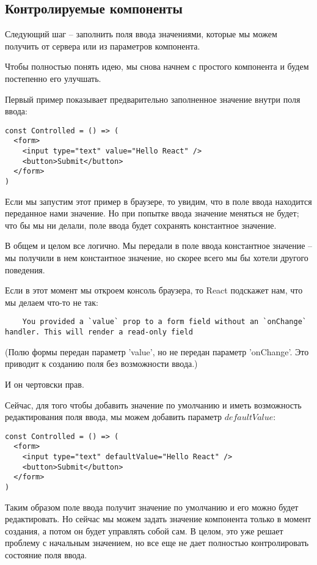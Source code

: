 \subsection{Контролируемые компоненты}

Следующий шаг -- заполнить поля ввода значениями, которые мы можем получить от сервера или из параметров компонента.

Чтобы полностью понять идею, мы снова начнем с простого компонента и будем постепенно его улучшать.

Первый пример показывает предварительно заполненное значение внутри поля ввода:

\begin{lstlisting}
const Controlled = () => (
  <form>
    <input type="text" value="Hello React" />
    <button>Submit</button>
  </form>
)
\end{lstlisting}

Если мы запустим этот пример в браузере, то увидим, что в поле ввода находится переданное нами значение. Но при попытке ввода значение меняться не будет; что бы мы ни делали, поле ввода будет сохранять константное значение.

В общем и целом все логично. Мы передали в поле ввода константное значение -- мы получили в нем константное значение, но скорее всего мы бы хотели другого поведения.

Если в этот момент мы откроем консоль браузера, то React подскажет нам, что мы делаем что-то не так:

\begin{lstlisting}
	You provided a `value` prop to a form field without an `onChange` handler. This will render a read-only field
\end{lstlisting}

(Полю формы передан параметр 'value', но не передан параметр 'onChange'. Это приводит к созданию поля без возможности ввода.)

И он чертовски прав.

Сейчас, для того чтобы добавить значение по умолчанию и иметь возможность редактирования поля ввода, мы можем добавить параметр $defaultValue$:

\begin{lstlisting}
const Controlled = () => (
  <form>
    <input type="text" defaultValue="Hello React" />
    <button>Submit</button>
  </form>
)
\end{lstlisting} 

Таким образом поле ввода получит значение по умолчанию и его можно будет редактировать. Но сейчас мы можем задать значение компонента только в момент создания, а потом он будет управлять собой сам. В целом, это уже решает проблему с начальным значением, но все еще не дает полностью контролировать состояние поля ввода.

